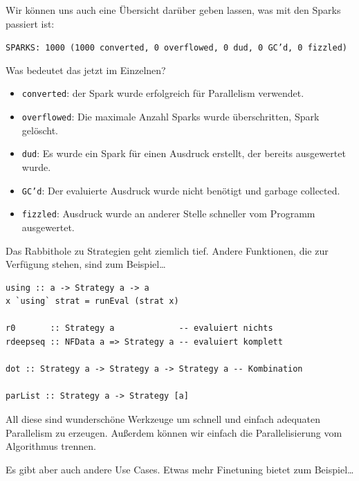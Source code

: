 \documentclass{beamer}
\begin{document}
\begin{frame}
Wir können uns auch eine Übersicht darüber geben lassen, was mit den Sparks passiert ist:

\scriptsize
\texttt{SPARKS: 1000 (1000 converted, 0 overflowed, 0 dud, 0 GC'd, 0 fizzled)}
\normalsize\bigskip
\pause

Was bedeutet das jetzt im Einzelnen?\pause
\begin{itemize}
\item \texttt{converted}: der Spark wurde erfolgreich für Parallelism verwendet.\pause
\item \texttt{overflowed}: Die maximale Anzahl Sparks wurde überschritten, Spark gelöscht.\pause
\item \texttt{dud}: Es wurde ein Spark für einen Ausdruck erstellt, der bereits ausgewertet wurde.\pause
\item \texttt{GC'd}: Der evaluierte Ausdruck wurde nicht benötigt und garbage collected.\pause
\item \texttt{fizzled}: Ausdruck wurde an anderer Stelle schneller vom Programm ausgewertet.
\end{itemize}

\end{frame}


\begin{frame}[fragile]

Das Rabbithole zu Strategien geht ziemlich tief. Andere Funktionen, die zur Verfügung stehen, sind zum Beispiel\dots\smallskip

\begin{verbatim}
using :: a -> Strategy a -> a
x `using` strat = runEval (strat x)

r0       :: Strategy a             -- evaluiert nichts
rdeepseq :: NFData a => Strategy a -- evaluiert komplett

dot :: Strategy a -> Strategy a -> Strategy a -- Kombination

parList :: Strategy a -> Strategy [a]
\end{verbatim}
\pause

All diese sind wunderschöne Werkzeuge um schnell und einfach adequaten Parallelism zu erzeugen. Außerdem können wir einfach die Parallelisierung vom Algorithmus trennen.\bigskip

Es gibt aber auch andere Use Cases. Etwas mehr Finetuning bietet zum Beispiel\dots

\end{frame}
\end{document}
